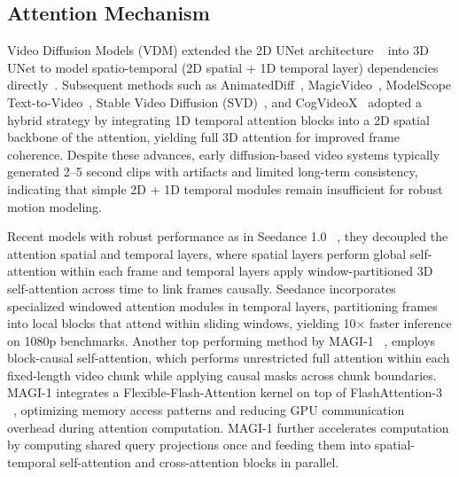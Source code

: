 \subsection{Attention Mechanism}
Video Diffusion Models (VDM) extended the 2D UNet architecture ~\cite{unet2015} into 3D UNet to model spatio-temporal (2D spatial + 1D temporal layer) dependencies directly~\cite{ho2022vdm}. Subsequent methods such as AnimatedDiff~\cite{gu2023animatediff}, MagicVideo~\cite{magicvideo2022}, ModelScope Text-to-Video~\cite{modelscope2023}, Stable Video Diffusion (SVD)~\cite{ho2023svd}, and CogVideoX~\cite{yang2024cogvideox} adopted a hybrid strategy by integrating 1D temporal attention blocks into a 2D spatial backbone of the attention, yielding full 3D attention for improved frame coherence. Despite these advances, early diffusion-based video systems typically generated  2–5 second clips with artifacts and limited long-term consistency, indicating that simple 2D + 1D temporal modules remain insufficient for robust motion modeling. 

Recent models with robust performance as in Seedance 1.0 ~\cite{gao2025seedance}, they decoupled the attention spatial and temporal layers, where spatial layers perform global self-attention within each frame and temporal layers apply window-partitioned 3D self-attention across time to link frames causally. Seedance incorporates specialized windowed attention modules in temporal layers, partitioning frames into local blocks that attend within sliding windows, yielding 10× faster inference on 1080p benchmarks. Another top performing method by MAGI-1 ~\cite{teng2025magi1}, employs block-causal self-attention, which performs unrestricted full attention within each fixed-length video chunk while applying causal masks across chunk boundaries. MAGI-1 integrates a Flexible-Flash-Attention kernel on top of FlashAttention-3 ~\cite{shah2024flashattention3}, optimizing memory access patterns and reducing GPU communication overhead during attention computation. MAGI-1 further accelerates computation by computing shared query projections once and feeding them into spatial-temporal self-attention and cross-attention blocks in parallel.
